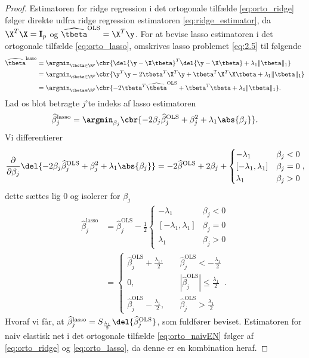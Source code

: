 \begin{proof}
Estimatoren for ridge regression i det ortogonale tilfælde \eqref{eq:orto_ridge} følger direkte udfra ridge regression estimatoren \eqref{eq:ridge_estimator}, da \(\X^T \X = \mathbf{I}_p\) og \(\widehat{\tbeta}^\text{OLS} = \X^T \y\).
For at bevise lasso estimatoren i det ortogonale tilfælde \eqref{eq:orto_lasso}, omskrives lasso problemet \eqref{eq:2.5} til følgende
\begin{align*}
\widehat{\tbeta}^\text{lasso} &= \argmin_{\tbeta \in \R^p} \cbr{\del{\y - \X \tbeta}^T \del{\y - \X \tbeta} + \lambda_1 \Vert \tbeta \Vert_1} \\
&= \argmin_{\tbeta \in \R^p} \cbr{ \y^T \y - 2 \tbeta^T \X^T \y + \tbeta^T \X^T \X \tbeta + \lambda_1 \Vert \tbeta \Vert_1} \\
&= \argmin_{\tbeta \in \R^p} \cbr{- 2 \tbeta^T \widehat{\tbeta}^\text{OLS} + \tbeta^T \tbeta + \lambda_1 \Vert \tbeta \Vert_1}.
\end{align*}
Lad os blot betragte \(j\)'te indeks af lasso estimatoren
\begin{align*}
\widehat{\beta}_j^\text{lasso} = \argmin_{\beta_j} \cbr{ - 2 \beta_j \widehat{\beta}_j^\text{OLS} + \beta_j^2 + \lambda_1 \abs{ \beta_j }}.
\end{align*}
Vi differentierer
\begin{align*}
\frac{\partial}{\partial \beta_j} \del{- 2 \beta_j \widehat{\beta}_j^\text{OLS} + \beta_j^2 + \lambda_1 \abs{ \beta_j }}
=-2\widehat{\beta}^\text{OLS} + 2\beta_j + \begin{cases}
-\lambda_1 \quad &\beta_j < 0 \\
[-\lambda_1, \lambda_1] & \beta_j = 0 \\
\lambda_1 & \beta_j >0 
\end{cases},
\end{align*}
dette sættes lig \(0\) og isolerer for \(\beta_j\)
\begin{align*}
\widehat{\beta}_j^\text{lasso} &= \widehat{\beta}_j^\text{OLS} - \frac{1}{2}\begin{cases}
-\lambda_1 \quad &\beta_j < 0 \\
[-\lambda_1, \lambda_1] & \beta_j = 0 \\
\lambda_1 & \beta_j >0 
\end{cases} \\
&= \begin{cases}
\widehat{\beta}_j^\text{OLS} + \frac{\lambda_1,}{2} \quad &\widehat{\beta}_j^\text{OLS} < - \frac{\lambda_1}{2} \\
0, &\left\vert\widehat{\beta}_j^\text{OLS} \right\vert \leq \frac{\lambda_1}{2} \\
\widehat{\beta}_j^\text{OLS} - \frac{\lambda_1}{2}, \quad &\widehat{\beta}_j^\text{OLS} > \frac{\lambda_1}{2}
\end{cases}. 
\end{align*}
Hvoraf vi får, at \(\widehat{\beta}_j^\text{lasso} = S_{\frac{\lambda_1}{2}} \del{ \widehat{\beta}_j^\text{OLS}} \), som fuldfører beviset.
Estimatoren for naiv elastisk net i det ortogonale tilfælde \eqref{eq:orto_naivEN} følger af \eqref{eq:orto_ridge} og \eqref{eq:orto_lasso}, da denne er en kombination heraf.
\end{proof}
